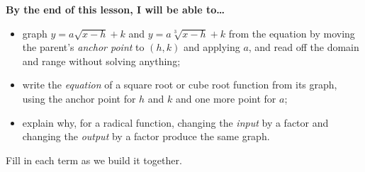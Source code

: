 \documentclass[10pt]{article}
\begin{document}
\namedateperiod

\vspace{0.08in}

\begin{objectivebox}
\textbf{By the end of this lesson, I will be able to\dots}
\begin{itemize}\setlength{\itemsep}{2pt}
  \item graph $y=a\sqrt{x-h}+k$ and $y=a\sqrt[3]{x-h}+k$ from the equation by moving the parent's \emph{anchor point} to $(h,k)$ and applying $a$, and read off the domain and range without solving anything;
  \item write the \emph{equation} of a square root or cube root function from its graph, using the anchor point for $h$ and $k$ and one more point for $a$;
  \item explain why, for a radical function, changing the \emph{input} by a factor and changing the \emph{output} by a factor produce the same graph.
\end{itemize}
\end{objectivebox}

\vspace{0.05in}

\begin{vocabbox}
\small
Fill in each term as we build it together.
\par\vspace{2pt}   %
\end{vocabbox}
\end{document}
